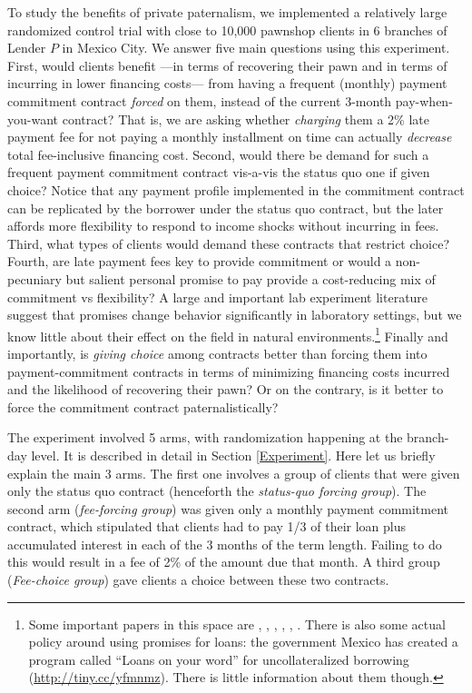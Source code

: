 \documentclass[11pt]{article}
\begin{document}
To study the benefits of private paternalism, we implemented a relatively large randomized control trial with close to 10,000 pawnshop clients in 6 branches of Lender $P$ in Mexico City. We answer five main questions using this experiment. First, would clients benefit  ---in terms of recovering their pawn and in terms of incurring in lower financing costs---  from having a frequent (monthly) payment commitment contract \textit{forced} on them, instead of the current 3-month pay-when-you-want contract? That is, we are asking whether \textit{charging} them a 2\% late payment fee for not paying a monthly installment on time can actually \textit{decrease} total fee-inclusive financing cost. Second, would there be demand for such a frequent payment commitment contract vis-a-vis the status quo one if given choice? Notice that any payment profile implemented in the commitment contract can be replicated by the borrower under the status quo contract, but the later affords more flexibility to respond to income shocks without incurring in fees. Third, what types of clients would demand these contracts that restrict choice? Fourth, are late payment fees key to provide commitment or would a non-pecuniary but salient personal promise to pay provide a cost-reducing mix of commitment vs flexibility? A large and important lab experiment literature suggest that promises change behavior significantly in laboratory settings, but we know little about their effect on the field in natural environments.\footnote{Some important papers in this space are \cite{PromisesPartnerships}, \cite{Vanberg}, \cite{Belot2010}, \cite{WhyDoPromises}, \cite{FurtherPromises}, \cite{Ismayilov2017}. There is also some actual policy around using promises for loans: the government Mexico has created a program called ``Loans on your word'' for uncollateralized borrowing (\url{http://tiny.cc/yfmnmz}). There is little information about them though.} Finally and importantly, is \textit{giving choice} among contracts better than forcing them into payment-commitment contracts in terms of minimizing financing costs incurred and the likelihood of recovering their pawn? Or on the contrary, is it better to force the commitment contract 
paternalistically?

The experiment involved 5 arms, with randomization happening at the branch-day level. It is described in detail in Section \ref{Experiment}. Here let us briefly explain the main 3 arms. The first one involves a group of clients that were given only the status quo contract (henceforth the \textit{status-quo forcing group}). The second arm (\textit{fee-forcing group}) was given only a monthly payment commitment contract, which stipulated that clients had to pay 1/3 of their loan plus accumulated interest in each of the 3 months of the term length. Failing to do this would result in a fee of 2\% of the amount due that month. A third group (\textit{Fee-choice group}) gave clients a choice between these two contracts. 
\end{document}
